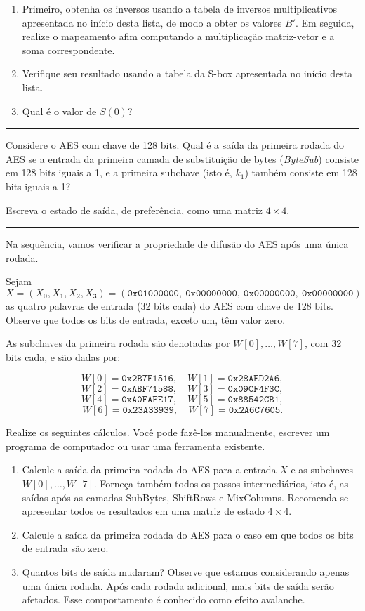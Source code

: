 \documentclass[12pt,a4paper]{article}
\newcommand{\exercicio}[1]{%
    \par\vspace{1.2em}
    \noindent
    {\color{black!55}\rule[-0.25em]{3pt}{1.6em}}%
    \hspace{0.6em}{\Large\bfseries Exerc\'{i}cio #1}
    \par\vspace{-0.4em}
    \noindent{\color{black!35}\rule{\textwidth}{0.4pt}}
    \par\vspace{0.35em}
}
\begin{document}
\begin{enumerate}[label=\arabic*.]
    \item Primeiro, obtenha os inversos usando a tabela de inversos multiplicativos apresentada no in\'{i}cio desta lista, de modo a obter os valores $B'$. Em seguida, realize o mapeamento afim computando a multiplica\c{c}\~{a}o matriz-vetor e a soma correspondente.
    \item Verifique seu resultado usando a tabela da S-box apresentada no in\'{i}cio desta lista.
    \item Qual \'{e} o valor de $S(0)$?
\end{enumerate}

\exercicio{6}
Considere o AES com chave de 128 bits. Qual \'{e} a sa\'{i}da da primeira rodada do AES se a entrada da primeira camada de substitui\c{c}\~{a}o de bytes (\textit{ByteSub}) consiste em 128 bits iguais a 1, e a primeira subchave (isto \'{e}, $k_1$) tamb\'{e}m consiste em 128 bits iguais a 1?

Escreva o estado de sa\'{i}da, de prefer\^{e}ncia, como uma matriz $4 \times 4$.

\exercicio{7}
Na sequ\^{e}ncia, vamos verificar a propriedade de difus\~{a}o do AES ap\'{o}s uma \'{u}nica rodada.

Sejam
\[
X = (X_0, X_1, X_2, X_3) = (\texttt{0x01000000},\ \texttt{0x00000000},\ \texttt{0x00000000},\ \texttt{0x00000000})
\]
as quatro palavras de entrada (32 bits cada) do AES com chave de 128 bits. Observe que todos os bits de entrada, exceto um, t\^{e}m valor zero.

As subchaves da primeira rodada s\~{a}o denotadas por $W[0], \ldots, W[7]$, com 32 bits cada, e s\~{a}o dadas por:

\[
W[0] = \texttt{0x2B7E1516}, \quad W[1] = \texttt{0x28AED2A6},
\]
\[
W[2] = \texttt{0xABF71588}, \quad W[3] = \texttt{0x09CF4F3C},
\]
\[
W[4] = \texttt{0xA0FAFE17}, \quad W[5] = \texttt{0x88542CB1},
\]
\[
W[6] = \texttt{0x23A33939}, \quad W[7] = \texttt{0x2A6C7605}.
\]

Realize os seguintes c\'{a}lculos. Voc\^{e} pode faz\^{e}-los manualmente, escrever um programa de computador ou usar uma ferramenta existente.

\begin{enumerate}[label=\arabic*.]
    \item Calcule a sa\'{i}da da primeira rodada do AES para a entrada $X$ e as subchaves $W[0], \ldots, W[7]$. Forne\c{c}a tamb\'{e}m todos os passos intermedi\'{a}rios, isto \'{e}, as sa\'{i}das ap\'{o}s as camadas SubBytes, ShiftRows e MixColumns. Recomenda-se apresentar todos os resultados em uma matriz de estado $4 \times 4$.
    \item Calcule a sa\'{i}da da primeira rodada do AES para o caso em que todos os bits de entrada s\~{a}o zero.
    \item Quantos bits de sa\'{i}da mudaram? Observe que estamos considerando apenas uma \'{u}nica rodada. Ap\'{o}s cada rodada adicional, mais bits de sa\'{i}da ser\~{a}o afetados. Esse comportamento \'{e} conhecido como efeito avalanche.
\end{enumerate}
\end{document}

